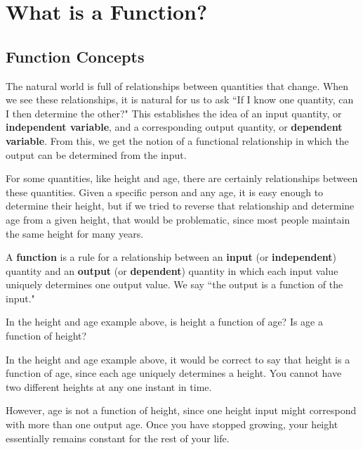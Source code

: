 \section{What is a Function?}
\label{sec:functions}

\subsection{Function Concepts}

The natural world is full of relationships between quantities that change. When we see these
relationships, it is natural for us to ask ``If I know one quantity, can I then determine the other?" This establishes the idea of an input quantity, or {\bf independent variable}, and a corresponding output quantity, or {\bf dependent variable}. From this, we get the notion of a functional relationship in which the output can be determined from the input.

For some quantities, like height and age, there are certainly relationships between these
quantities. Given a specific person and any age, it is easy enough to determine their height, but if we tried to reverse that relationship and determine age from a given height, that would be problematic, since most people maintain the same height for many years.

\begin{definition}
A {\bf function} is a rule for a relationship between an {\bf input} (or {\bf independent}) quantity and an {\bf output} (or {\bf dependent}) quantity in which each input value uniquely determines one output value. We say ``the output is a function of the input."
\end{definition}

\begin{example}
\label{ex:height}
In the height and age example above, is height a function of age? Is age a function of height?

\begin{solution} In the height and age example above, it would be correct to say that height is a function of age, since each age uniquely determines a height. You cannot have two different heights at any one instant in time.

However, age is not a function of height, since one height input might correspond with more than one output age. Once you have stopped growing, your height essentially remains constant for the rest of your life.
\end{solution}\end{example}

